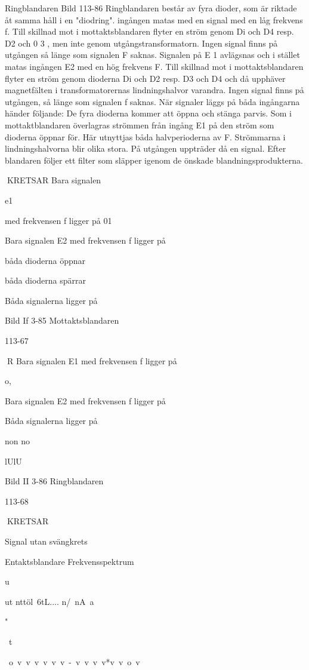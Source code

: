 Ringblandaren
Bild 113-86
Ringblandaren består av fyra dioder, som är
riktade åt samma håll i en "diodring".
ingången
matas med en signal med en
låg frekvens f. Till skillnad mot i mottaktsblandaren flyter en ström genom Di och D4
resp. D2 och 0 3 , men inte genom utgångstransformatorn. Ingen signal finns på utgången så länge som signalen F saknas.
Signalen på E 1 avlägsnas och i stället
matas ingången E2 med en hög frekvens F.
Till skillnad mot i mottaktsblandaren flyter en
ström genom dioderna Di och D2 resp. D3
och D4 och då upphäver magnetfälten i
transformatorernas lindningshalvor varandra. Ingen signal finns på utgången, så länge
som signalen f saknas.
När signaler läggs på båda ingångarna
händer följande:
De fyra dioderna kommer att öppna och
stänga parvis. Som i mottaktblandaren överlagras strömmen från ingång E1 på den
ström som dioderna öppnar för.
Här utnyttjas båda halvperioderna av F.
Strömmarna i lindningshalvorna blir olika
stora. På utgången uppträder då en signal.
Efter blandaren följer ett filter som släpper
igenom de önskade blandningsprodukterna.

KRETSAR
Bara signalen

e1

med frekvensen f ligger på
01

Bara signalen E2 med frekvensen f ligger på

båda dioderna öppnar

båda dioderna spärrar

Båda signalerna ligger på

Bild If 3-85 Mottaktsblandaren

113-67

R
Bara signalen E1 med frekvensen f ligger på

o,

Bara signalen E2 med frekvensen f ligger på

Båda signalerna ligger på

non no

lUlU

Bild II 3-86 Ringblandaren

113-68

KRETSAR

Signal utan svängkrets

Entaktsblandare
Frekvensspektrum

u

ut
nttöl\ 6tL.... n/\ nA~a

"

~t

~o~v~v~v~v~v~v~-~v~v\ v~v*v~v~o~v~~

